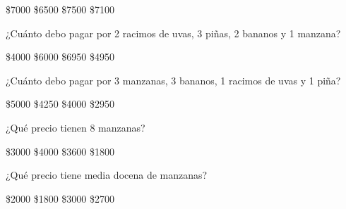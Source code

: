 \documentclass[10pt,letterpaper,addpoints]{exam}
\begin{document}
\begin{questions}
\begin{oneparchoices}
\choice \$7000
\choice \$6500
\choice \$7500
\CorrectChoice \$7100
\end{oneparchoices}
\question ¿Cuánto debo pagar por 2 racimos de uvas, 3 piñas, 2 bananos y 1 manzana?

\begin{oneparchoices}
\choice \$4000
\choice \$6000
\CorrectChoice \$6950
\choice \$4950
\end{oneparchoices}
\question
¿Cuánto debo pagar por 3 manzanas, 3 bananos, 1 racimos de uvas y 1 piña?

\begin{oneparchoices}
\choice \$5000
\CorrectChoice \$4250
\choice \$4000
\choice \$2950
\end{oneparchoices}
\question ¿Qué precio tienen 8 manzanas?

\begin{oneparchoices}
\choice \$3000
\choice \$4000
\CorrectChoice \$3600
\choice \$1800
\end{oneparchoices}
\question \label{quest20}
¿Qu\'e precio tiene media docena de manzanas?

\begin{oneparchoices}
\choice \$2000
\choice \$1800
\choice \$3000
\CorrectChoice \$2700
\end{oneparchoices}
\end{questions}
\end{document}
